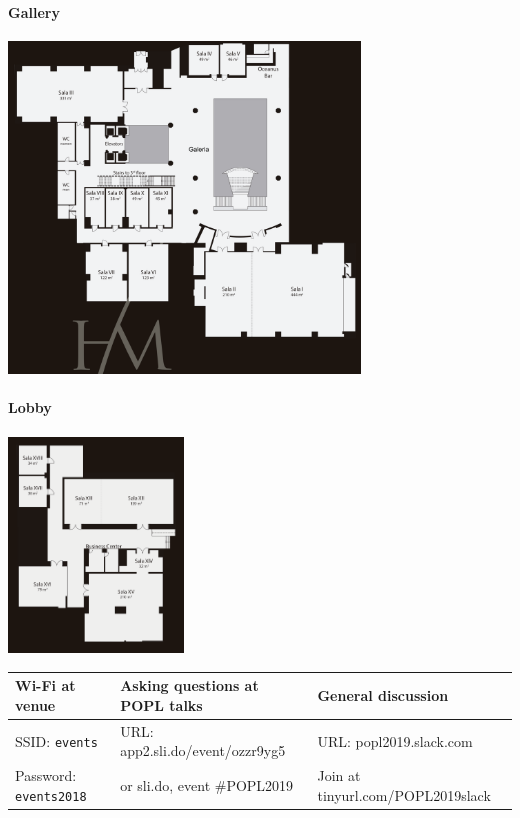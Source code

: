 \label{Floorplan}

\paragraph{Gallery}
\begin{center}
  \includegraphics[width=0.7\textwidth]{img/gallery}
\end{center}

\paragraph{Lobby}
\begin{center}
  \includegraphics[width=0.35\textwidth]{img/lobby}
\end{center}

\vfil
\begin{tabular}{|l|l|l|} \hline
Wi-Fi at venue & Asking questions at POPL talks & General discussion \\ \hline 
SSID: \texttt{events} & URL: app2.sli.do/event/ozzr9yg5 & URL: popl2019.slack.com \\
Password: \texttt{events2018} & or sli.do, event \#POPL2019 & Join at tinyurl.com/POPL2019slack\\ \hline
\end{tabular} 


\newpage

